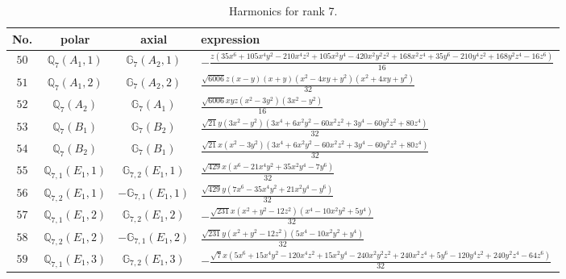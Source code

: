 \documentclass[fleqn,8pt,landscape]{jsarticle}
\begin{document}
\begin{table}[ht!]
\begin{center}
\caption{Harmonics for rank 7.}
\renewcommand{\arraystretch}{1.3}
\begin{tabular}{cccl} \hline \hline
No. & polar & axial & expression \\ \hline
$ 50 $ & $ \mathbb{Q}_{7}(A_{1},1) $ & $ \mathbb{G}_{7}(A_{2},1) $ & $ - \frac{z \left(35 x^{6} + 105 x^{4} y^{2} - 210 x^{4} z^{2} + 105 x^{2} y^{4} - 420 x^{2} y^{2} z^{2} + 168 x^{2} z^{4} + 35 y^{6} - 210 y^{4} z^{2} + 168 y^{2} z^{4} - 16 z^{6}\right)}{16} $ \\
$ 51 $ & $ \mathbb{Q}_{7}(A_{1},2) $ & $ \mathbb{G}_{7}(A_{2},2) $ & $ \frac{\sqrt{6006} z \left(x - y\right) \left(x + y\right) \left(x^{2} - 4 x y + y^{2}\right) \left(x^{2} + 4 x y + y^{2}\right)}{32} $ \\
$ 52 $ & $ \mathbb{Q}_{7}(A_{2}) $ & $ \mathbb{G}_{7}(A_{1}) $ & $ \frac{\sqrt{6006} x y z \left(x^{2} - 3 y^{2}\right) \left(3 x^{2} - y^{2}\right)}{16} $ \\
$ 53 $ & $ \mathbb{Q}_{7}(B_{1}) $ & $ \mathbb{G}_{7}(B_{2}) $ & $ \frac{\sqrt{21} y \left(3 x^{2} - y^{2}\right) \left(3 x^{4} + 6 x^{2} y^{2} - 60 x^{2} z^{2} + 3 y^{4} - 60 y^{2} z^{2} + 80 z^{4}\right)}{32} $ \\
$ 54 $ & $ \mathbb{Q}_{7}(B_{2}) $ & $ \mathbb{G}_{7}(B_{1}) $ & $ \frac{\sqrt{21} x \left(x^{2} - 3 y^{2}\right) \left(3 x^{4} + 6 x^{2} y^{2} - 60 x^{2} z^{2} + 3 y^{4} - 60 y^{2} z^{2} + 80 z^{4}\right)}{32} $ \\
$ 55 $ & $ \mathbb{Q}_{7,1}(E_{1},1) $ & $ \mathbb{G}_{7,2}(E_{1},1) $ & $ \frac{\sqrt{429} x \left(x^{6} - 21 x^{4} y^{2} + 35 x^{2} y^{4} - 7 y^{6}\right)}{32} $ \\
$ 56 $ & $ \mathbb{Q}_{7,2}(E_{1},1) $ & $ -\mathbb{G}_{7,1}(E_{1},1) $ & $ \frac{\sqrt{429} y \left(7 x^{6} - 35 x^{4} y^{2} + 21 x^{2} y^{4} - y^{6}\right)}{32} $ \\
$ 57 $ & $ \mathbb{Q}_{7,1}(E_{1},2) $ & $ \mathbb{G}_{7,2}(E_{1},2) $ & $ - \frac{\sqrt{231} x \left(x^{2} + y^{2} - 12 z^{2}\right) \left(x^{4} - 10 x^{2} y^{2} + 5 y^{4}\right)}{32} $ \\
$ 58 $ & $ \mathbb{Q}_{7,2}(E_{1},2) $ & $ -\mathbb{G}_{7,1}(E_{1},2) $ & $ \frac{\sqrt{231} y \left(x^{2} + y^{2} - 12 z^{2}\right) \left(5 x^{4} - 10 x^{2} y^{2} + y^{4}\right)}{32} $ \\
$ 59 $ & $ \mathbb{Q}_{7,1}(E_{1},3) $ & $ \mathbb{G}_{7,2}(E_{1},3) $ & $ - \frac{\sqrt{7} x \left(5 x^{6} + 15 x^{4} y^{2} - 120 x^{4} z^{2} + 15 x^{2} y^{4} - 240 x^{2} y^{2} z^{2} + 240 x^{2} z^{4} + 5 y^{6} - 120 y^{4} z^{2} + 240 y^{2} z^{4} - 64 z^{6}\right)}{32} $ \\

\end{tabular}
\end{center}
\end{table}
\end{document}
